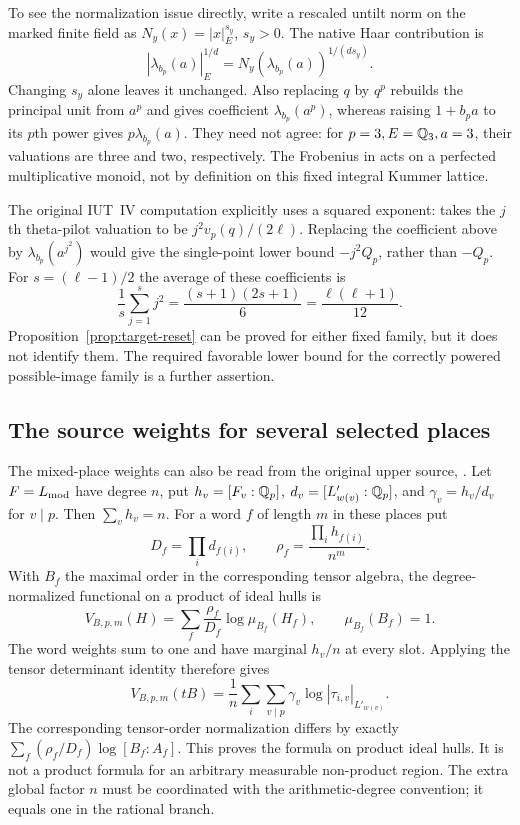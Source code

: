 To see the normalization issue directly, write a rescaled untilt norm
on the marked finite field as $N_y(x)=|x|_E^{s_y}$, $s_y>0$.
The native Haar contribution is
\[
 |\lambda_{b_p}(a)|_E^{1/d}
   =N_y(\lambda_{b_p}(a))^{1/(ds_y)}.
\]
Changing $s_y$ alone leaves it unchanged.
Also replacing $q$ by $q^p$ rebuilds the principal unit from $a^p$ and
gives coefficient $\lambda_{b_p}(a^p)$, whereas raising $1+b_pa$
to its $p$th power gives $p\lambda_{b_p}(a)$.
They need not agree: for $p=3,E=\mathbb Q_3,a=3$, their valuations are three
and two, respectively. The Frobenius in
\cite[Corollary~5.6.2]{JoshiIIhalf} acts on a perfected multiplicative
monoid, not by definition on this fixed integral Kummer lattice.

The original IUT~IV computation explicitly uses a squared exponent:
\cite[Theorem~1.10, Step~(v), author-version pp.~27--29]{IUT4} takes
the $j$th theta-pilot valuation to be $j^2v_p(q)/(2\ell)$.
Replacing the coefficient above by $\lambda_{b_p}(a^{j^2})$ would
give the single-point lower bound $-j^2Q_p$, rather than $-Q_p$.
For $s=(\ell-1)/2$ the average of these coefficients is
\[
 \frac1s\sum_{j=1}^s j^2=\frac{(s+1)(2s+1)}6
                          =\frac{\ell(\ell+1)}{12}.
\]
Proposition~\ref{prop:target-reset} can be proved for either fixed family,
but it does not identify them. The required favorable lower bound for
the correctly powered possible-image family is a further assertion.

\subsection{The source weights for several selected places}
The mixed-place weights can also be read from the original upper source,
\cite[Remark~1.7.1, author-version p.~17]{IUT4}.
Let $F=L_{\rm mod}$ have degree $n$, put
$h_v=[F_v:\mathbb Q_p]$, $d_v=[L'_{w(v)}:\mathbb Q_p]$, and
$\gamma_v=h_v/d_v$ for $v\mid p$. Then $\sum_vh_v=n$.
For a word $f$ of length $m$ in these places put
\[
 D_f=\prod_i d_{f(i)},\qquad \rho_f=\frac{\prod_i h_{f(i)}}{n^m}.
\]
With $B_f$ the maximal order in the corresponding tensor algebra, the
degree-normalized functional on a product of ideal hulls is
\[
 V_{B,p,m}(H)=\sum_f\frac{\rho_f}{D_f}\log\mu_{B_f}(H_f),
 \qquad \mu_{B_f}(B_f)=1.
\]
The word weights sum to one and have marginal $h_v/n$ at every slot.
Applying the tensor determinant identity therefore gives
\[
 V_{B,p,m}(tB)=\frac1n\sum_i\sum_{v\mid p}
                      \gamma_v\log|\tau_{i,v}|_{L'_{w(v)}}.
\]
The corresponding tensor-order normalization differs by exactly
$\sum_f(\rho_f/D_f)\log[B_f:A_f]$.
This proves the formula on product ideal hulls. It is not a product
formula for an arbitrary measurable non-product region. The extra global
factor $n$ must be coordinated with the arithmetic-degree convention;
it equals one in the rational branch.

